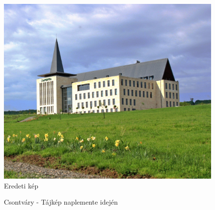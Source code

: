 \documentclass[12pt, a4paper, oneside]{book}
\theoremstyle{tetel}
\begin{document}
\begin{subappendices}
		\begin{figure}[!htbp]
			\begin{center}
				\includegraphics[scale=0.5]{stylistic/original/sapientia.jpg}
				\caption[]{Eredeti kép}
				\label{original_sapientia}
			\end{center}
		\end{figure}
		
		\begin{figure}[!htbp]
			\centering
			\caption[]{Csontváry - Tájkép naplemente idején}
			\label{sapi_1}
		\end{figure}
	

\end{subappendices}
\end{document}
